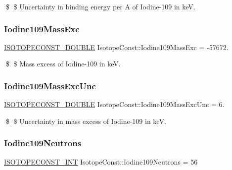\$ \$ Uncertainty in binding energy per A of Iodine-\/109 in keV. \mbox{\label{group___isotope_const-_iodine-_i109_gaec16a964ff83841b83230a88ea70b897}} 
\subsubsection{\texorpdfstring{Iodine109\+Mass\+Exc}{Iodine109MassExc}}
{\footnotesize\ttfamily \mbox{\hyperlink{group___isotope_const-_macros_ga8f45a7272ce02c0b4c65c44636ed719a}{I\+S\+O\+T\+O\+P\+E\+C\+O\+N\+S\+T\+\_\+\+D\+O\+U\+B\+LE}} Isotope\+Const\+::\+Iodine109\+Mass\+Exc = -\/57672.}

\$ \$ Mass excess of Iodine-\/109 in keV. \mbox{\label{group___isotope_const-_iodine-_i109_gafbe91348d82bc899ad6c39cb72ca66a9}} 
\subsubsection{\texorpdfstring{Iodine109\+Mass\+Exc\+Unc}{Iodine109MassExcUnc}}
{\footnotesize\ttfamily \mbox{\hyperlink{group___isotope_const-_macros_ga8f45a7272ce02c0b4c65c44636ed719a}{I\+S\+O\+T\+O\+P\+E\+C\+O\+N\+S\+T\+\_\+\+D\+O\+U\+B\+LE}} Isotope\+Const\+::\+Iodine109\+Mass\+Exc\+Unc = 6.}

\$ \$ Uncertainty in mass excess of Iodine-\/109 in keV. \mbox{\label{group___isotope_const-_iodine-_i109_gaff66486cc009827c507ef4feadeb47f3}} 
\subsubsection{\texorpdfstring{Iodine109\+Neutrons}{Iodine109Neutrons}}
{\footnotesize\ttfamily \mbox{\hyperlink{group___isotope_const-_macros_ga5f18360b3e99483a35c32d789e62621c}{I\+S\+O\+T\+O\+P\+E\+C\+O\+N\+S\+T\+\_\+\+I\+NT}} Isotope\+Const\+::\+Iodine109\+Neutrons = 56}

